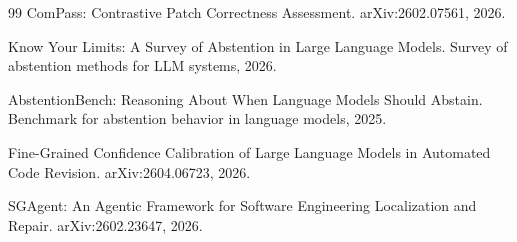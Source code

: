\begin{thebibliography}{99}
ComPass: Contrastive Patch Correctness Assessment.
arXiv:2602.07561, 2026.

Know Your Limits: A Survey of Abstention in Large Language Models.
Survey of abstention methods for LLM systems, 2026.

AbstentionBench: Reasoning About When Language Models Should Abstain.
Benchmark for abstention behavior in language models, 2025.

Fine-Grained Confidence Calibration of Large Language Models in Automated Code Revision.
arXiv:2604.06723, 2026.

SGAgent: An Agentic Framework for Software Engineering Localization and Repair.
arXiv:2602.23647, 2026.

\end{thebibliography}
